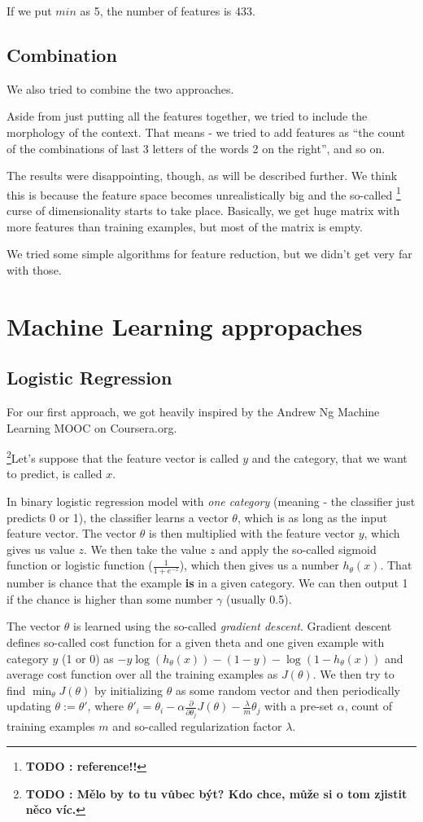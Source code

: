 \documentclass[letterpaper]{article}
\newcommand{\todofn}[1] {
 \footnote{\textbf{TODO : #1}}}
\begin{document}
If we put $min$ as 5, the number of features is 433.

\subsection{Combination}
We also tried to combine the two approaches.

Aside from just putting all the features together, we tried to include the morphology of the context. 
That means - we tried to add features as ``the count of the combinations of last 3 letters of the words 2 on the right'', and so on.

The results were disappointing, though, as will be described further. 
We think this is because the feature space becomes unrealistically big and the so-called \todofn{reference!!} curse of dimensionality starts to take place. Basically, we get huge matrix with more features than training examples, but most of the matrix is empty.

We tried some simple algorithms for feature reduction, but we didn't get very far with those.

\section{Machine Learning appropaches}
\subsection{Logistic Regression}
For our first approach, we got heavily inspired by the Andrew Ng Machine Learning MOOC  on Coursera.org.

\todofn{Mělo by to tu vůbec být? Kdo chce, může si o tom zjistit něco víc.}Let's suppose that the feature vector is called $y$ and the category, that we want to predict, is called $x$.

In binary logistic regression model with \emph{one category} (meaning - the classifier just predicts 0 or 1), the classifier learns a vector $\theta$, which is as long as the input feature vector. The vector $\theta$ is then multiplied with the feature vector $y$, which gives us value $z$. We then take the value $z$ and apply the so-called sigmoid function or logistic function ($\frac{1}{1+e^{-z}}$), which then gives us a number $h_\theta(x)$. That number is chance that the example \textbf{is} in a given category. We can then output 1 if the chance is higher than some number $\gamma$ (usually 0.5).

The vector $\theta$ is learned using the so-called \emph{gradient descent}. Gradient descent defines so-called cost function for a given theta and one given example with category $y$ (1 or 0) as $-y \log(h_\theta(x))-(1-y)-\log(1-h_\theta(x))$ and average cost function over all the training examples as $J(\theta)$. We then try to find $\min_\theta J(\theta)$ by initializing $\theta$ as some random vector and then periodically updating $\theta:=\theta'$, where $\theta'_i=\theta_i-\alpha\frac{\partial}{\partial \theta_j}J(\theta)-\frac{\lambda}{m}\theta_j$ with a pre-set $\alpha$, count of training examples $m$ and so-called regularization factor $\lambda$.
\end{document}
